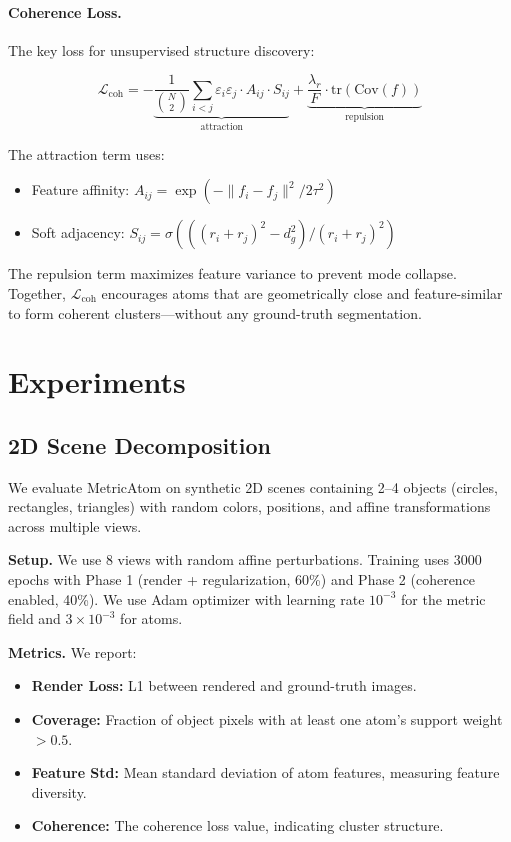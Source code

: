 \documentclass[11pt]{article}
\begin{document}
\paragraph{Coherence Loss.} The key loss for unsupervised structure discovery:

\begin{equation}
    \mathcal{L}_{\text{coh}} = -\underbrace{\frac{1}{\binom{N}{2}} \sum_{i < j} \varepsilon_i \varepsilon_j \cdot A_{ij} \cdot S_{ij}}_{\text{attraction}} + \underbrace{\frac{\lambda_r}{F} \cdot \text{tr}(\text{Cov}(f))}_{\text{repulsion}}
\end{equation}

The attraction term uses:
\begin{itemize}
    \item Feature affinity: $A_{ij} = \exp(-\|f_i - f_j\|^2 / 2\tau^2)$
    \item Soft adjacency: $S_{ij} = \sigma(( (r_i + r_j)^2 - d_g^2) / (r_i + r_j)^2)$
\end{itemize}

The repulsion term maximizes feature variance to prevent mode collapse. Together, $\mathcal{L}_{\text{coh}}$ encourages atoms that are geometrically close and feature-similar to form coherent clusters---without any ground-truth segmentation.

\section{Experiments}

\subsection{2D Scene Decomposition}

We evaluate MetricAtom on synthetic 2D scenes containing 2--4 objects (circles, rectangles, triangles) with random colors, positions, and affine transformations across multiple views.

\textbf{Setup.} We use 8 views with random affine perturbations. Training uses 3000 epochs with Phase 1 (render + regularization, 60\%) and Phase 2 (coherence enabled, 40\%). We use Adam optimizer with learning rate $10^{-3}$ for the metric field and $3\times 10^{-3}$ for atoms.

\textbf{Metrics.} We report:
\begin{itemize}
    \item \textbf{Render Loss:} L1 between rendered and ground-truth images.
    \item \textbf{Coverage:} Fraction of object pixels with at least one atom's support weight $> 0.5$.
    \item \textbf{Feature Std:} Mean standard deviation of atom features, measuring feature diversity.
    \item \textbf{Coherence:} The coherence loss value, indicating cluster structure.
\end{itemize}
\end{document}
